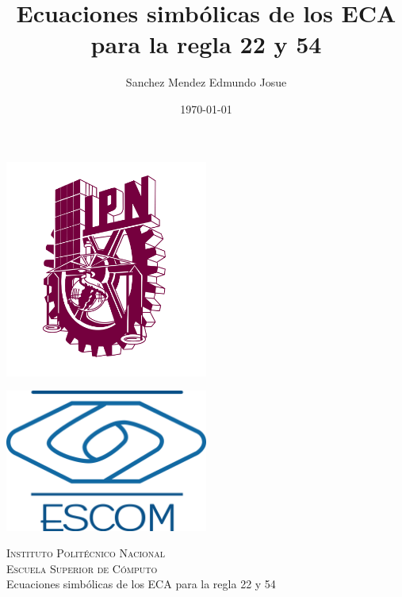 \documentclass[11pt]{article}
\date{\today}
\title{Ecuaciones simbólicas de los ECA para la regla 22 y 54}
\author{Sanchez Mendez Edmundo Josue}
\begin{document}
		\begin{titlepage}
			\begin{center}
				
				
				\noindent
				\begin{minipage}{0.5\textwidth}
					\begin{flushleft} \large
						\includegraphics[width=0.5\textwidth]{resources/ipn.png}
					\end{flushleft}
				\end{minipage}%
				\begin{minipage}{0.55\textwidth}
					\begin{flushright} \large
						\includegraphics[width=0.5\textwidth]{resources/escom.png}
					\end{flushright}
				\end{minipage}
				
				\textsc{\LARGE Instituto Politécnico Nacional}\\[0.5cm]
				
				\textsc{\Large Escuela Superior de Cómputo}\\[1cm]
				
				
				{ \huge Ecuaciones simbólicas de los ECA para la regla 22 y 54  \\[1cm] }
				

\end{center}
\end{titlepage}
\end{document}
